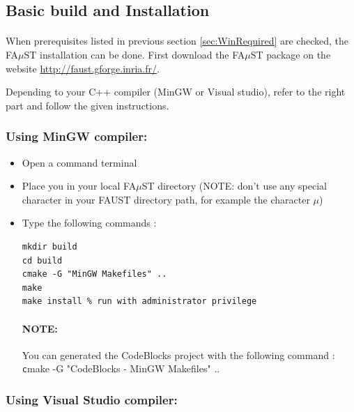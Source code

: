 \subsection{Basic build and Installation}\label{sec:WinBasicInstall}
\paragraph{}When prerequisites listed in previous section \ref{sec:WinRequired} are checked, the FA$\mu$ST installation can be done. 
First download the FA$\mu$ST package on the website  \url{http://faust.gforge.inria.fr/}. 

Depending to your C++ compiler (MinGW or Visual studio), refer to the right part and follow the given instructions.
\\

\subsubsection{Using MinGW compiler:}
\label{sec:WinMinGWBasicInstall}

\begin{itemize}
\item Open a command terminal
\item Place you in your local FA$\mu$ST directory (NOTE: don't use any special character in your FAUST directory path, for example the character $\mu$)
\item Type the following commands : 

\begin{lstlisting}
mkdir build
cd build
cmake -G "MinGW Makefiles" .. 
make
make install % run with administrator privilege
\end{lstlisting}
\paragraph{NOTE:} You can generated the CodeBlocks project with the following command : \\
\texttt cmake -G "CodeBlocks - MinGW Makefiles" .. 

\end{itemize}

\subsubsection{Using Visual Studio compiler:}\label{sec:WinVisualStudioBasicInstall}
